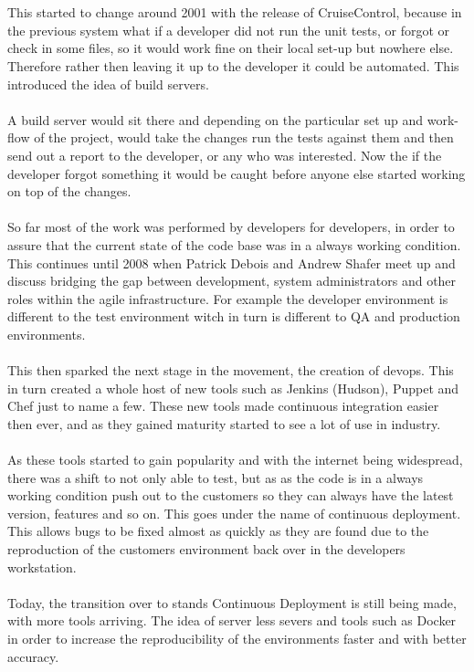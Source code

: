 \\\\
This started to change around 2001 with the release of CruiseControl, because in the previous system what if a developer did not run the unit tests, or forgot or check in some files, so it would work fine on their local set-up but nowhere else. Therefore rather then leaving it up to the developer it could be automated. This introduced the idea of build servers. 
\\\\
A build server would sit there and depending on the particular set up and work-flow of the project,  would take the changes run the tests against them and then send out a report to the developer, or any who was interested. Now the if the developer forgot something it would be caught before anyone else started working on top of the changes.
\\\\
So far most of the work was performed by developers for developers, in order to assure that the current state of the code base was in a always working condition. This continues until 2008 when Patrick Debois and Andrew Shafer meet up and discuss bridging the gap between development, system administrators and other roles within the agile infrastructure. For example the developer environment is different to the test environment witch in turn is different to QA and production environments. 
\\\\
This then sparked the next stage in the movement, the creation of devops. This in turn created a whole host of new tools such as Jenkins (Hudson), Puppet and Chef just to name a few. These new tools made continuous integration easier then ever, and as they gained maturity started to see a lot of use in industry.
\\\\
As these tools started to gain popularity and with the internet being widespread, there was a shift to not only able to test, but as as the code is in a always working condition push out to the customers so they can always have the latest version, features and so on. This goes under the name of continuous deployment. This allows bugs to be fixed almost as quickly as they are found due to the reproduction of the customers environment back over in the developers workstation.
\\\\
Today, the transition over to stands Continuous Deployment is still being made, with more tools arriving. The idea of server less severs and tools such as Docker in order to increase the reproducibility of the environments faster and with better accuracy.